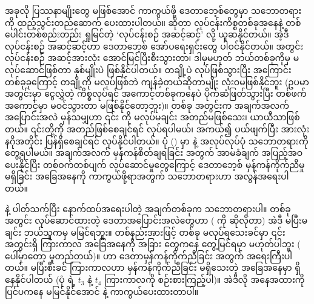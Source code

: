 အခုလို ပြဿနာမျိုးတွေ မဖြစ်အောင် ကာကွယ်ဖို့ ဒေတာဘေ့စ်တွေမှာ  သဘောတရားကို ထည့်သွင်းတည်ဆောက် ပေးထားပါတယ်။  ဆိုတာ လုပ်ငန်းကိစ္စတစ်ခုအနေနဲ့ တစ်ပေါင်းတစ်စည်းတည်း ရှုမြင်တဲ့ ‘လုပ်ငန်းစဉ် အဆင့်ဆင့်’ လို့ ယူဆနိုင်တယ်။ အဲ့ဒီ လုပ်ငန်းစဉ် အဆင့်ဆင့်ဟာ ဒေတာဘေ့စ်  အော်ပရေးရှင်းတွေ ပါဝင်နိုင်တယ်။  အတွင်း လုပ်ငန်းစဉ် အဆင့်အားလုံး အောင်မြင်ပြီးစီးသွားတာ၊ ဒါမှမဟုတ် ဘယ်တစ်ခုကိုမှ မလုပ်ဆောင်ဖြစ်တာ နှစ်မျိုးပဲ ဖြစ်နိုင်ပါတယ်။ တချို့ပဲ လုပ်ဖြစ်သွားပြီး အကြောင်း တစ်ခုခုကြောင့် တချို့ကို မလုပ်ဖြစ်ဘဲ ကျန်ခဲ့တယ်ဆိုတာမျိုး လုံးဝမဖြစ်နိုင်ဘူး (ဥပမာ  အတွင်းမှာ ငွေလွှဲတဲ့ ကိစ္စလုပ်ရင် အကောင့်တစ်ခုကနေပဲ ပိုက်ဆံဖြတ်သွားပြီး တစ်ဖက်အကောင့်မှာ မဝင်သွားတာ မဖြစ်နိုင်တော့ဘူး)။  တစ်ခု အတွင်းက အချက်အလက် အပြောင်းအလဲ မှန်သမျှဟာ ၎င်း  ကို  မလုပ်မချင်း အတည်မဖြစ်သေး၊ ယာယီသာဖြစ်တယ်။ ၎င်းတို့ကို အတည်ဖြစ်စေချင်ရင်  လုပ်ရပါမယ်၊ အကယ်၍ ပယ်ဖျက်ပြီး အားလုံးနဂိုအတိုင်း ပြန်ရှိစေချင်ရင်  လုပ်နိုင်ပါတယ်။ ပုံ (\fRefNo{\ref{fig:txn_commit_rollback}}) မှာ  နဲ့  အလုပ်လုပ်ပုံ သဘောတရားကို တွေ့ရပါမယ်။ အချက်အလက် မှန်ကန်စိတ်ချရခြင်း  အတွက် အာမခံချက် အပြည့်အဝ ပေးနိုင်ပြီး တစ်ဝက်တစ်ပျက် လုပ်ဆောင်မှုတွေကြောင့် ဒေတာဘေ့စ် မှန်ကန်ကိုက်ညီမှု မရှိခြင်း အခြေအနေကို ကာကွယ်ဖို့ရာအတွက်  သဘောတရားဟာ အလွန်အရေးပါတယ်။ 





 နဲ့ ပါတ်သက်ပြီး နောက်ထပ်အရေးပါတဲ့ အချက်တစ်ခုက  သဘောတရားပါ။  တစ်ခုအတွင်း လုပ်ဆောင်ထားတဲ့ ဒေတာအပြောင်းအလဲတွေဟာ ( ကို ဆိုလိုတာ) အဲဒီ  မပြီးမချင်း ဘယ်သူကမှ မမြင်ရဘူး။ တစ်နည်းအားဖြင့်  တစ်ခု  မလုပ်ရသေးခင်မှာ ၎င်းအတွင်းရှိ ကြားကာလ အခြေအနေကို အခြား  တွေကနေ တွေ့မြင်ရမှာ မဟုတ်ပါဘူး ( ပေါ်မှာတော့ မူတည်တယ်)။  ဟာ ဒေတာမှန်ကန်ကိုက်ညီခြင်း အတွက် အရေးကြီးပါတယ်။  မပြီးစီးခင် ကြားကာလဟာ မှန်ကန်ကိုက်ညီခြင်း မရှိသေးတဲ့ အခြေအနေမှာ ရှိနေနိုင်ပါတယ် (ပုံ \fRefNo{\ref{fig:txn_commit_rollback}} ရဲ့ $t_3$ နဲ့ $t_4$ ကြားကာလကို စဉ်းစားကြည့်ပါ)။ အဲဒီလို အနေအထားကို ပြင်ပကနေ မမြင်နိုင်အောင်  နဲ့ ကာကွယ်ပေးထားတာပါ။ 

